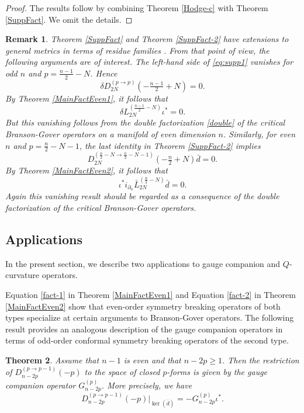 \documentclass[a4paper,12pt,reqno]{amsart}
\newtheorem{theorem}{Theorem}
\newtheorem{bem}[theorem]{Remark}
\numberwithin{theorem}{subsection}
\numberwithin{equation}{section}
\begin{document}
\begin{proof} The results follow by combining Theorem \ref{Hodge-c} with
Theorem \ref{SuppFact}. We omit the details.
\end{proof}

\begin{bem}\label{SF-CBGO} Theorem \ref{SuppFact} and Theorem \ref{SuppFact-2} have extensions
to general metrics in terms of residue families \cite{fjs}. From that point of
view, the following arguments are of interest. The left-hand side of
\eqref{eq:supp1} vanishes for odd $n$ and $p=\frac{n-1}{2}-N$. Hence
$$
   \delta D_{2N}^{(p \to p)}(-\tfrac{n-1}{2}+N) = 0.
$$
By Theorem \ref{MainFactEven1}, it follows that
$$
   \delta L_{2N}^{(\frac{n-1}{2}-N)} \iota^* = 0.
$$
But this vanishing follows from the double factorization \eqref{double} of the
critical Branson-Gover operators on a manifold of even dimension $n$.
Similarly, for even $n$ and $p=\frac{n}{2}-N-1$, the last identity in Theorem
\ref{SuppFact-2} implies
$$
   D_{2N}^{(\frac{n}{2}-N \to \frac{n}{2}-N-1)}(-\tfrac{n}{2}+N) \bar{d} = 0.
$$
By Theorem \ref{MainFactEven2}, it follows that
$$
   \iota^* i_{\partial_n} \bar{L}_{2N}^{(\frac{n}{2}-N)} \bar{d} = 0.
$$
Again this vanishing result should be regarded as a consequence of the double
factorization of the critical Branson-Gover operators.
\end{bem}

\subsection{Applications}\label{applic}

In the present section, we describe two applications to gauge companion and
$Q$-curvature operators.

Equation \eqref{fact-1} in Theorem \ref{MainFactEven1} and Equation
\eqref{fact-2} in Theorem \ref{MainFactEven2} show that even-order symmetry
breaking operators of both types specialize at certain arguments to
Branson-Gover operators. The following result provides an analogous description
of the gauge companion operators in terms of odd-order conformal symmetry
breaking operators of the second type.

\begin{theorem}\label{TheGOperator} Assume that $n-1$ is even and that $n-2p \ge 1$. Then
the restriction of $D^{(p \to p-1)}_{n-2p}(-p)$ to the space of closed
$p$-forms is given by the gauge companion operator $G_{n-2p}^{(p)}$. More
precisely, we have
\begin{equation}\label{DG}
   D^{(p\to p-1)}_{n-2p}(-p)|_{\ker(\bar{d})} = -G^{(p)}_{n-2p} \iota^*.
\end{equation}
\end{theorem}
\end{document}
